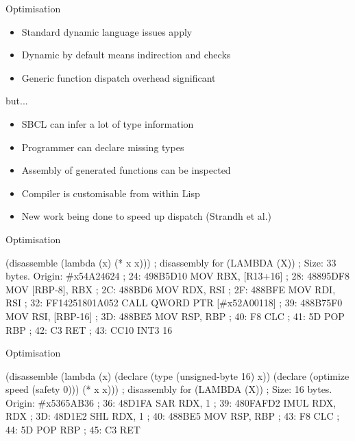 \documentclass[14pt,t,aspectratio=169]{beamer}
\renewcommand{\title}[1]{
  {\huge #1} \vskip 0.4cm
}
\begin{document}
\begin{frame}
  \title{Optimisation}
  \begin{itemize}
  \item Standard dynamic language issues apply
  \item Dynamic by default means indirection and checks
  \item Generic function dispatch overhead significant
  \end{itemize}
  \pause
  but...
  \begin{itemize}
  \item SBCL can infer a lot of type information
  \item Programmer can declare missing types
  \item Assembly of generated functions can be inspected
  \item Compiler is customisable from within Lisp
  \item New work being done to speed up dispatch (Strandh et al.)
  \end{itemize}
\end{frame}

\begin{frame}[fragile]
  \title{Optimisation}
\begin{lispcode}
(disassemble
  (lambda (x)
    (* x x)))
; disassembly for (LAMBDA (X))
; Size: 33 bytes. Origin: #x54A24624
; 24:       498B5D10         MOV RBX, [R13+16]
; 28:       48895DF8         MOV [RBP-8], RBX
; 2C:       488BD6           MOV RDX, RSI
; 2F:       488BFE           MOV RDI, RSI
; 32:       FF14251801A052   CALL QWORD PTR [#x52A00118]
; 39:       488B75F0         MOV RSI, [RBP-16]
; 3D:       488BE5           MOV RSP, RBP
; 40:       F8               CLC
; 41:       5D               POP RBP
; 42:       C3               RET
; 43:       CC10             INT3 16
\end{lispcode}
\end{frame}

\begin{frame}[fragile]
  \title{Optimisation}
\begin{lispcode}
(disassemble
  (lambda (x)
    (declare (type (unsigned-byte 16) x))
    (declare (optimize speed (safety 0)))
    (* x x)))
; disassembly for (LAMBDA (X))
; Size: 16 bytes. Origin: #x5365AB36
; 36:       48D1FA           SAR RDX, 1
; 39:       480FAFD2         IMUL RDX, RDX
; 3D:       48D1E2           SHL RDX, 1
; 40:       488BE5           MOV RSP, RBP
; 43:       F8               CLC
; 44:       5D               POP RBP
; 45:       C3               RET
\end{lispcode}
\end{frame}
\end{document}
